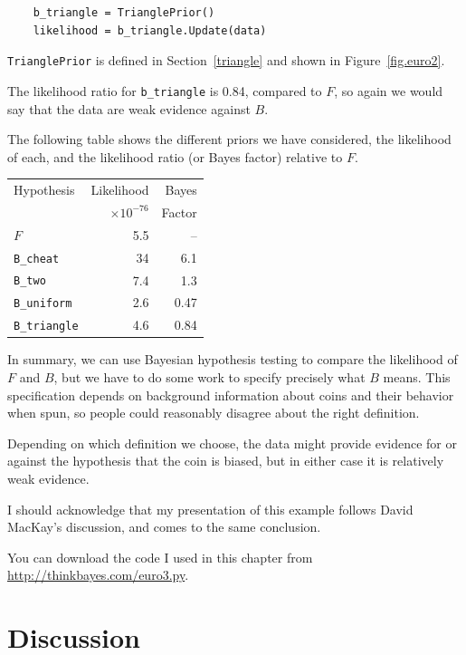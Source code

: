 \documentclass[12pt]{book}
\begin{document}
\begin{verbatim}
    b_triangle = TrianglePrior()
    likelihood = b_triangle.Update(data)
\end{verbatim}

{\tt TrianglePrior} is defined in Section~\ref{triangle} and
shown in Figure~\ref{fig.euro2}.

The likelihood ratio for \verb"b_triangle" is 0.84, compared to $F$, so
again we would say that the data are weak evidence against $B$.

The following table shows the different priors we have considered, the
likelihood of each, and the likelihood ratio (or Bayes factor)
relative to $F$.

\begin{tabular}{|l|r|r|}
\hline
Hypothesis   & Likelihood & Bayes  \\
             & $\times 10^{-76}$ & Factor  \\
\hline
$F$              & 5.5   & --   \\
\verb"B_cheat"  & 34   &  6.1   \\
\verb"B_two"     & 7.4   &  1.3   \\
\verb"B_uniform"  & 2.6   &  0.47   \\
\verb"B_triangle"  & 4.6   &  0.84   \\
\hline
\end{tabular}

In summary, we can use Bayesian hypothesis testing to compare the
likelihood of $F$ and $B$, but we have to do some work to specify
precisely what $B$ means.  This specification depends on background
information about coins and their behavior when spun, so people
could reasonably disagree about the right definition.

Depending on which definition we choose, the data might provide
evidence for or against the hypothesis that the coin is biased, but
in either case it is relatively weak evidence.

I should acknowledge that my presentation of this example follows
David MacKay's discussion, and comes to the same conclusion.

You can download the code I used in this chapter from
\url{http://thinkbayes.com/euro3.py}.


\section{Discussion}
\end{document}
